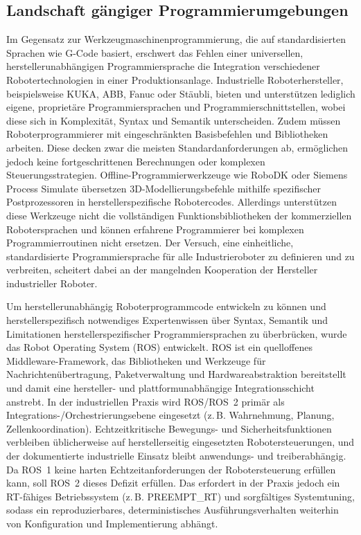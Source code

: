 \subsection{Landschaft gängiger Programmierumgebungen}
Im Gegensatz zur
Werkzeugmaschinenprogrammierung, die auf standardisierten Sprachen wie G-Code
basiert, erschwert das Fehlen einer universellen, herstellerunabhängigen
Programmiersprache die Integration verschiedener Robotertechnologien in einer
Produktionsanlage. Industrielle
Roboterhersteller, beispielsweise KUKA, ABB,
Fanuc oder Stäubli, bieten und unterstützen lediglich eigene,
proprietäre Programmiersprachen
und Programmierschnittstellen, wobei diese sich in
Komplexität, Syntax und Semantik
unterscheiden. Zudem müssen Roboterprogrammierer mit
eingeschränkten Basisbefehlen
und Bibliotheken arbeiten. Diese decken zwar die meisten Standardanforderungen
ab, ermöglichen jedoch keine fortgeschrittenen Berechnungen oder komplexen
Steuerungsstrategien. Offline-Programmierwerkzeuge wie RoboDK oder Siemens
Process Simulate übersetzen 3D-Modellierungsbefehle mithilfe spezifischer
Postprozessoren in herstellerspezifische Robotercodes. Allerdings unterstützen
diese Werkzeuge nicht die vollständigen Funktionsbibliotheken der kommerziellen
Robotersprachen und können erfahrene Programmierer bei komplexen
Programmierroutinen nicht ersetzen. Der
Versuch, eine einheitliche, standardisierte Programmiersprache für
alle Industrieroboter zu definieren und zu
verbreiten, scheitert dabei an der mangelnden Kooperation der
Hersteller industrieller Roboter.

Um herstellerunabhängig Roboterprogrammcode entwickeln zu können und
herstellerspezifisch notwendiges Expertenwissen über Syntax, Semantik und
Limitationen herstellerspezifischer Programmiersprachen
zu überbrücken, wurde das Robot Operating System (ROS) entwickelt.
ROS ist ein quelloffenes
Middleware-Framework, das Bibliotheken und Werkzeuge für
Nachrichtenübertragung, Paketverwaltung und Hardwareabstraktion
bereitstellt und damit eine hersteller- und
plattformunabhängige Integrationsschicht
anstrebt. In der industriellen Praxis wird
ROS/ROS~2 primär als Integrations-/Orchestrierungsebene
eingesetzt (z.\,B. Wahrnehmung, Planung, Zellenkoordination).
Echtzeitkritische Bewegungs- und Sicherheitsfunktionen verbleiben
üblicherweise auf herstellerseitig eingesetzten Robotersteuerungen, und der
dokumentierte industrielle Einsatz bleibt anwendungs- und
treiberabhängig. Da ROS~1
keine harten Echtzeitanforderungen der Robotersteuerung erfüllen
kann, soll ROS~2 dieses Defizit erfüllen.
Das erfordert in der Praxis jedoch ein RT-fähiges
Betriebssystem (z.\,B. PREEMPT\_RT) und sorgfältiges Systemtuning,
sodass ein reproduzierbares, deterministisches Ausführungsverhalten
weiterhin von Konfiguration und
Implementierung
abhängt.

